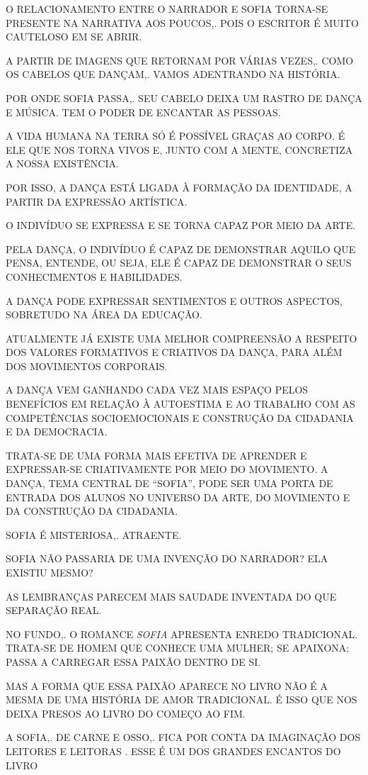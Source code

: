 \documentclass{extarticle}
\begin{document}
O RELACIONAMENTO ENTRE O NARRADOR E SOFIA TORNA-SE PRESENTE NA NARRATIVA
AOS POUCOS,. POIS O ESCRITOR É MUITO CAUTELOSO EM SE ABRIR.
 
A PARTIR DE IMAGENS QUE RETORNAM POR VÁRIAS VEZES,. COMO OS CABELOS QUE
DANÇAM,. VAMOS ADENTRANDO NA HISTÓRIA.
 
POR ONDE SOFIA PASSA,. SEU CABELO DEIXA UM RASTRO DE DANÇA E MÚSICA. TEM
O PODER DE ENCANTAR AS PESSOAS.

A VIDA HUMANA NA TERRA SÓ É POSSÍVEL GRAÇAS AO CORPO. É ELE QUE NOS
TORNA VIVOS E, JUNTO COM A MENTE, CONCRETIZA A NOSSA EXISTÊNCIA.~
 
POR ISSO, A DANÇA ESTÁ LIGADA À FORMAÇÃO DA IDENTIDADE, A PARTIR DA
EXPRESSÃO ARTÍSTICA.
 
O INDIVÍDUO SE EXPRESSA E SE TORNA CAPAZ POR MEIO DA ARTE.
 
PELA DANÇA, O INDIVÍDUO É CAPAZ DE DEMONSTRAR AQUILO QUE PENSA, ENTENDE,
OU SEJA, ELE É CAPAZ DE DEMONSTRAR O SEUS CONHECIMENTOS E HABILIDADES.
 
A DANÇA PODE EXPRESSAR SENTIMENTOS E OUTROS ASPECTOS, SOBRETUDO NA ÁREA
DA EDUCAÇÃO.
 
ATUALMENTE JÁ EXISTE UMA MELHOR COMPREENSÃO A RESPEITO DOS VALORES
FORMATIVOS E CRIATIVOS DA DANÇA, PARA ALÉM DOS MOVIMENTOS CORPORAIS.
 
A DANÇA VEM GANHANDO CADA VEZ MAIS ESPAÇO PELOS BENEFÍCIOS EM RELAÇÃO À
AUTOESTIMA E AO TRABALHO COM AS COMPETÊNCIAS SOCIOEMOCIONAIS E
CONSTRUÇÃO DA CIDADANIA E DA DEMOCRACIA.
 
TRATA-SE DE UMA FORMA MAIS EFETIVA DE APRENDER E EXPRESSAR-SE
CRIATIVAMENTE POR MEIO DO MOVIMENTO. A DANÇA, TEMA CENTRAL DE ``SOFIA'',
PODE SER UMA PORTA DE ENTRADA DOS ALUNOS NO UNIVERSO DA ARTE, DO
MOVIMENTO E DA CONSTRUÇÃO DA CIDADANIA.

SOFIA É MISTERIOSA,. ATRAENTE.
 
SOFIA NÃO PASSARIA DE UMA INVENÇÃO DO NARRADOR? ELA EXISTIU MESMO?
 
AS LEMBRANÇAS PARECEM MAIS SAUDADE INVENTADA DO QUE SEPARAÇÃO REAL.
 
NO FUNDO,. O ROMANCE \emph{SOFIA} APRESENTA ENREDO TRADICIONAL. TRATA-SE
DE HOMEM QUE CONHECE UMA MULHER; SE APAIXONA; PASSA A CARREGAR ESSA
PAIXÃO DENTRO DE SI.
 
MAS A FORMA QUE ESSA PAIXÃO APARECE NO LIVRO NÃO É A MESMA DE UMA
HISTÓRIA DE AMOR TRADICIONAL. É ISSO QUE NOS DEIXA PRESOS AO LIVRO DO
COMEÇO AO FIM.

A SOFIA,. DE CARNE E OSSO,. FICA POR CONTA DA IMAGINAÇÃO DOS LEITORES E
LEITORAS . ESSE É UM DOS GRANDES ENCANTOS DO LIVRO
 
\end{document}
